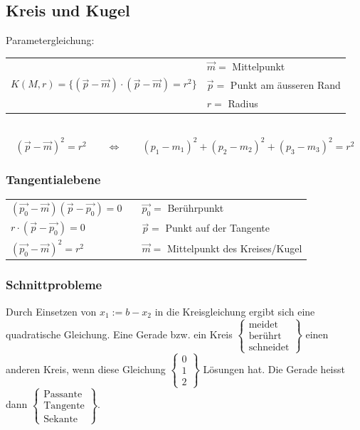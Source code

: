 \subsection{Kreis und Kugel}
	Parametergleichung: \begin{tabular}{ll}
		& $\vec{m} =$ Mittelpunkt \\
		$K(M,r) = \lbrace (\vec{p} - \vec{m}) \cdot (\vec{p} - \vec{m}) = r^2 \rbrace$ & $\vec{p} =$ Punkt am äusseren Rand\\
		& $r =$ Radius
	\end{tabular}\\

	\begin{equation*}
		(\vec{p} - \vec{m})^2 = r^2  \qquad \Leftrightarrow \qquad (p_1 - m_1)^2 + (p_2 - m_2)^2 + (p_3 - m_3)^2 = r^2
	\end{equation*}

	\subsubsection{Tangentialebene}
		\begin{tabular}{lll}
			$(\vec{p_0} - \vec{m})(\vec{p} - \vec{p_0}) = 0$ & & $\vec{p_0} =$ Berührpunkt\\
			$r \cdot (\vec{p} - \vec{p_0}) = 0$ & & $\vec{p} =$ Punkt auf der Tangente\\
			$(\vec{p_0} - \vec{m})^2 = r^2$ & & $\vec{m} =$ Mittelpunkt des Kreises/Kugel
		\end{tabular}

	\subsubsection{Schnittprobleme}
		Durch Einsetzen von $x_1:=b-x_2$ in die Kreisgleichung ergibt sich eine
		quadratische Gleichung. Eine Gerade bzw. ein Kreis
		$\left\{\begin{array}{l}\mbox{meidet}\\ \mbox{berührt}\\ \mbox{schneidet}\end{array}\right\}$ einen
		anderen Kreis, wenn diese Gleichung
		$\left\{\begin{array}{l}0\\1\\2\end{array}\right\}$ Lösungen hat. Die Gerade
		heisst dann
		$\left\{\begin{array}{l} \mbox{Passante}\\ \mbox{Tangente}\\ \mbox{Sekante}\end{array}\right\}$. 
	
